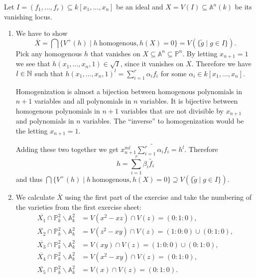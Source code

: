 \newcommand{\sheet}{2}




\maketitle

\begin{exercise}{1}
    Let $I = (f_1, \dots, f_r) \subseteq k[x_1, \dots, x_n]$ be an ideal and $X
    = V(I) \subseteq \mathbb{A}^n(k)$ be its vanishing locus.
    \begin{enumerate}
        \item{} We have to show
            \[
                \overline{X} = \bigcap \{V^+(h) \mid h\ \text{homogenous}, h(X) = 0\} =
                V(\{ \tilde{g} \mid g \in I \}).
            \]
            Pick any homogenous $h$ that vanishes on $X \subseteq \mathbb{A}^n \subseteq \mathbb{P}^n$. By letting $x_{n+1} =
            1$ we see that $h(x_1, \dots, x_n, 1) \in \sqrt{I}$, since it vanishes on
            $X$. Therefore we have $l \in \mathbb{N}$ such that $h(x_1, \dots, x_n, 1)^l
            = \sum_{i = 1}^{r} \alpha_i f_i$ for some $\alpha_i \in k[x_1,
            \dots, x_n]$.

            { \color{gray} Homogenization is almost a bijection between
            homogenous polynomials in $n+1$ variables and all polynomials in $n$
            variables. It is bijective between homogenous polynomials in $n+1$
            variables 
            that are not divisible by $x_{n+1}$ and polynomials in $n$
            variables. The ``inverse'' to homogenization would be the letting
            $x_{n+1} = 1$. }

            Adding these two together we get $x^{ml}_{n+1} \widetilde{\sum_{i =
            1}^{r} \alpha_i f_i} = h^l$. Therefore
            \[
                h = \sum^r_{i = 1} \beta_i \widetilde{f_i}
            \]
            and thus 
            $\bigcap \{V^+(h) \mid h\ \text{homogenous}, h(X) = 0\} \supseteq
            V(\{ \tilde{g} \mid g \in I \})$.

        \item{} We calculate $\overline{X}$ using the first part of the exercise and take the numbering of the
        varieties from the first exercise sheet:\\
        \begin{align*}
            \overline{X_1}\cap \mathbb{P}^2_k \backslash \mathbb{A}^2_k&=V(x^2-xz)\cap V(z)=(0:1:0),\\
            \overline{X_2}\cap \mathbb{P}^2_k \backslash \mathbb{A}^2_k&=V(z^2-xy)\cap V(z)=(1:0:0)\cup (0:1:0),\\
            \overline{X_3}\cap \mathbb{P}^2_k \backslash \mathbb{A}^2_k&=V(xy)\cap V(z)=(1:0:0)\cup (0:1:0),\\
            \overline{X_4}\cap \mathbb{P}^2_k \backslash \mathbb{A}^2_k&=V(x^2-xy)\cap V(z)=(0:1:0),\\
            \overline{X_5}\cap \mathbb{P}^2_k \backslash \mathbb{A}^2_k&=V(x)\cap V(z)=(0:1:0).
        \end{align*}


\end{enumerate}
\end{exercise}
